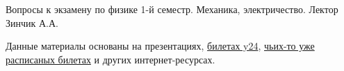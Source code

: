 Вопросы к экзамену по физике 1-й семестр. Механика, электричество. Лектор Зинчик А.А. 

Данные материалы основаны на презентациях, 
\href{https://www.notion.so/native/ea1ac09f314447ba9ff3c53c9288204c?ysclid=lr9ui9gdbb832178919&deepLinkOpenNewTab=true}{билетах y24}, 
\href{https://studfile.net/preview/17179894/}{чьих-то уже расписаных билетах} и других интернет-ресурсах.